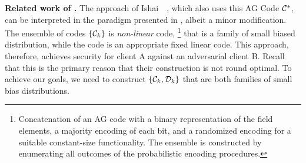 \noindent\textbf{Related work of \cite{FOCS:IKOS09}.} 
The approach of Ishai~\etal~\cite{FOCS:IKOS09}, which also uses this AG Code ${\mathcal C}^*$, can be interpreted in the paradigm presented in , albeit a minor modification. 
The ensemble of codes $\{{\mathcal C}_k\}$ is {\em non-linear} code,%
\footnote{
	Concatenation of an AG code with a binary representation of the field elements, a majority encoding of each bit, and a randomized encoding for a suitable constant-size functionality. 
	The ensemble is constructed by enumerating all outcomes of the probabilistic encoding procedures.  
}
that is a family of small biased distribution, while the code \cD is an appropriate fixed linear code. 
This approach, therefore, achieves security for client A against an adversarial client B. 
Recall that this is the primary reason that their construction is not round optimal. 
To achieve our goals, {we need to construct $\{{\mathcal C}_k, {\mathcal D}_k\}$ that are both families of small bias distributions.}  